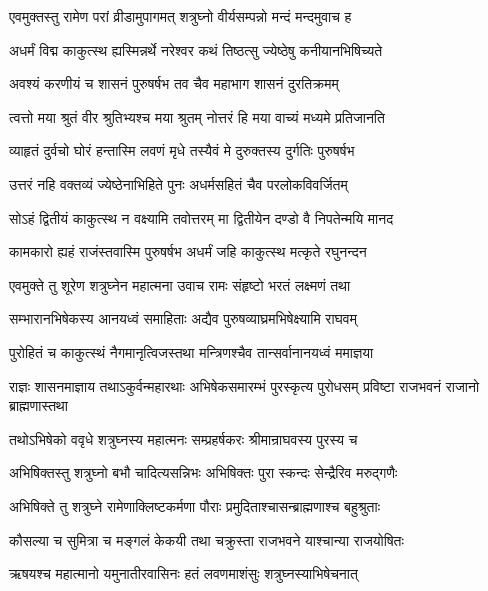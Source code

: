 
\twolineshloka
{एवमुक्तस्तु रामेण परां व्रीडामुपागमत्}
{शत्रुघ्नो वीर्यसम्पन्नो मन्दं मन्दमुवाच ह} %

\twolineshloka
{अधर्मं विद्म काकुत्स्थ ह्यस्मिन्नर्थे नरेश्वर}
{कथं तिष्ठत्सु ज्येष्ठेषु कनीयानभिषिच्यते} %

\twolineshloka
{अवश्यं करणीयं च शासनं पुरुषर्षभ}
{तव चैव महाभाग शासनं दुरतिक्रमम्} %

\twolineshloka
{त्वत्तो मया श्रुतं वीर श्रुतिभ्यश्च मया श्रुतम्}
{नोत्तरं हि मया वाच्यं मध्यमे प्रतिजानति} %

\twolineshloka
{व्याहृतं दुर्वचो घोरं हन्तास्मि लवणं मृधे}
{तस्यैवं मे दुरुक्तस्य दुर्गतिः पुरुषर्षभ} %

\twolineshloka
{उत्तरं नहि वक्तव्यं ज्येष्ठेनाभिहिते पुनः}
{अधर्मसहितं चैव परलोकविवर्जितम्} %

\twolineshloka
{सोऽहं द्वितीयं काकुत्स्थ न वक्ष्यामि तवोत्तरम्}
{मा द्वितीयेन दण्डो वै निपतेन्मयि मानद} %

\twolineshloka
{कामकारो ह्यहं राजंस्तवास्मि पुरुषर्षभ}
{अधर्मं जहि काकुत्स्थ मत्कृते रघुनन्दन} %

\twolineshloka
{एवमुक्ते तु शूरेण शत्रुघ्नेन महात्मना}
{उवाच रामः संहृष्टो भरतं लक्ष्मणं तथा} %

\twolineshloka
{सम्भारानभिषेकस्य आनयध्वं समाहिताः}
{अद्यैव पुरुषव्याघ्रमभिषेक्ष्यामि राघवम्} %

\twolineshloka
{पुरोहितं च काकुत्स्थं नैगमानृत्विजस्तथा}
{मन्त्रिणश्चैव तान्सर्वानानयध्वं ममाज्ञया} %

\threelineshloka
{राज्ञः शासनमाज्ञाय तथाऽकुर्वन्महारथाः}
{अभिषेकसमारम्भं पुरस्कृत्य पुरोधसम्}
{प्रविष्टा राजभवनं राजानो ब्राह्मणास्तथा} %

\twolineshloka
{तथोऽभिषेको ववृधे शत्रुघ्नस्य महात्मनः}
{सम्प्रहर्षकरः श्रीमान्राघवस्य पुरस्य च} %

\twolineshloka
{अभिषिक्तस्तु शत्रुघ्नो बभौ चादित्यसन्निभः}
{अभिषिक्तः पुरा स्कन्दः सेन्द्रैरिव मरुद्गणैः} %

\twolineshloka
{अभिषिक्ते तु शत्रुघ्ने रामेणाक्लिष्टकर्मणा}
{पौराः प्रमुदिताश्चासन्ब्राह्मणाश्च बहुश्रुताः} %

\twolineshloka
{कौसल्या च सुमित्रा च मङ्गलं केकयी तथा}
{चक्रुस्ता राजभवने याश्चान्या राजयोषितः} %

\twolineshloka
{ऋषयश्च महात्मानो यमुनातीरवासिनः}
{हतं लवणमाशंसुः शत्रुघ्नस्याभिषेचनात्} %

